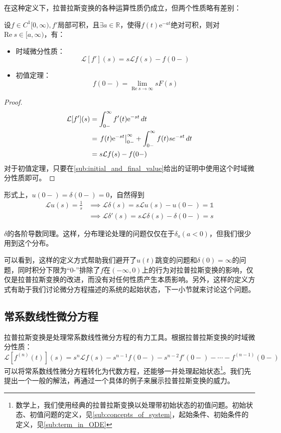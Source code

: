 在这种定义下，拉普拉斯变换的各种运算性质仍成立，但两个性质略有差别：
\begin{proposition}[改进的拉普拉斯变换的性质]
    设$f\in C^1[0,\infty),f'$局部可积，且$\exists a\in\mathbb{R}$，使得$f(t)\mathrm{e}^{-at}$绝对可积，则对$\text{Re}\ s\in[a,\infty)$，有：
    \begin{itemize}
        \item 时域微分性质：\[\mathcal{L} [f'](s)=s\mathcal{L} f(s)-f(0-)\]
        \item 初值定理：$$f(0-)=\lim_{\text{Re}\ s\to\infty}sF(s)$$
    \end{itemize}
\end{proposition}
\begin{proof}
    \begin{align*}
        \mathcal{L} [f'](s)&=\int_{0-}^{\infty}f'(t)\mathrm{e}^{-st}\,dt\\
        &=\left.f(t)\mathrm{e}^{-st}\right|_{0-}^{\infty}+\int_{0-}^{\infty}f(t)se^{-st}\,dt\\
        &=s\mathcal{L} f(s)-f(0-)
    \end{align*}
    对于初值定理，只要在\ref{sub:initial_and_final_value}给出的证明中使用这个时域微分性质即可。
\end{proof}

形式上，$u(0-)=\delta(0-)=0$，自然得到
\begin{align*}
    \mathcal{L} u(s)=\frac{1}{s}&\implies\mathcal{L} \delta(s)=s\mathcal{L} u(s)-u(0-)=\mathds{1}\\
    &\implies\mathcal{L} \delta'(s)=s\mathcal{L} \delta(s)-\delta(0-)=s
\end{align*}

$\delta$的各阶导数同理。这样，分布理论处理的问题仅仅在于$\delta_a(a<0)$，但我们很少用到这个分布。

可以看到，这样的定义方式帮助我们避开了$u(t)$跳变的问题和$\delta(0)=\infty$的问题，同时积分下限为“0-”排除了$f$在$(-\infty,0)$上的行为对拉普拉斯变换的影响，仅仅是拉普拉斯变换的改进，而没有对任何性质产生本质影响。另外，这样的定义方式有助于我们讨论微分方程描述的系统的起始状态，下一小节就来讨论这个问题。

\subsection{常系数线性微分方程}\label{sub:laplace_ODE}
拉普拉斯变换是处理常系数线性微分方程的有力工具。根据拉普拉斯变换的时域微分性质：
\[\mathcal{L}\left[f^{(n)}(t)\right](s)=s^n\mathcal{L} f(s)-s^{n-1}f(0-)-s^{n-2}f'(0-)-\cdots -f^{(n-1)}(0-)\]
可以将常系数线性微分方程转化为代数方程，还能够一并处理起始状态\footnote{数学上，我们使用经典的拉普拉斯变换以处理带初始状态的初值问题。初始状态、初值问题的定义，见\ref{sub:concepts_of_system}，起始条件、初始条件的定义，见\ref{sub:term_in_ODE}}。我们先提出一个一般的解法，再通过一个具体的例子来展示拉普拉斯变换的威力。

